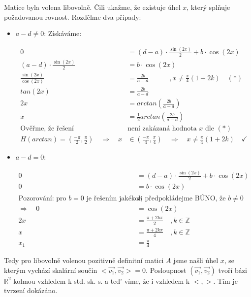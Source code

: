 \documentclass[12pt]{article}
\begin{document}
Matice byla volena libovolně. Čili ukažme, že existuje úhel $x$, který splňuje požadovanou rovnost. Rozdělme dva případy:

\begin{itemize}
  \item $a-d \neq 0$:
  Získáváme:
  
  \begin{align*}
    0 &= (d-a)\cdot \frac{\sin(2x)}{2} + b\cdot \cos(2x) \\
    (a-d)\cdot \frac{\sin(2x)}{2} &= b\cdot \cos(2x) \\
    \frac{\sin(2x)}{\cos(2x)} &= \frac{2b}{a-d} \quad\quad\quad ,x\neq \frac{\pi}{4}(1+2k) \quad (*)\\
    tan(2x) &= \frac{2b}{a-d} \\
    2x &= arctan\left(\frac{2b}{a-d}\right) \\
    x &= \frac{1}{2} arctan\left(\frac{2b}{a-d}\right) \quad \\
    \text{Ověřme, že řešení }&\text{není zakázaná hodnota }x \text{ dle }(*)\\
    H(arctan) = \left(\frac{-\pi}{2}, \frac{\pi}{2}\right) \quad \Rightarrow \quad x &\in \left(\frac{-\pi}{4}, \frac{\pi}{4}\right)
    \quad \Rightarrow \quad x \neq \frac{\pi}{4}(1+2k) \quad \checkmark
  \end{align*}

  \item $a-d = 0$:
  
    \begin{align*}
      0 &= (d-a)\cdot \frac{\sin(2x)}{2} + b\cdot \cos(2x) \\
      0 &= b\cdot \cos(2x) \\
      \text{Pozorování: pro }b=0\text{ je řešením jakékoli }&x\text{, předpokládejme BÚNO, že }b\neq0 \\
      \Rightarrow \quad 0 &= \cos(2x) \\
      2x &= \frac{\pi + 2k\pi}{2} \quad ,k\in\mathbb{Z} \\
      x &= \frac{\pi + 2k\pi}{4} \quad ,k\in\mathbb{Z} \\
      x_1 &= \frac{\pi}{4}
    \end{align*}

\end{itemize}

Tedy pro libovolně volenou pozitivně definitní matici $A$ jsme našli úhel $x$, se kterým vychází skalární součin $<\vec{v_1},\vec{v_2}> = 0$.
Posloupnost $(\vec{v_1},\vec{v_2})$ tvoří bázi $\mathbb{R}^2$ kolmou vzhledem k std. sk. s. a ted' víme, že i vzhledem k $<,>$.
Tím je tvrzení dokázáno.
\end{document}

